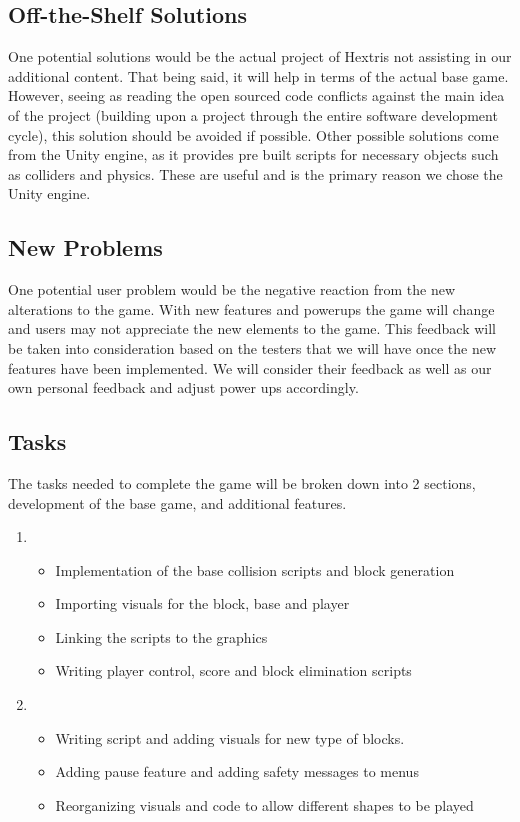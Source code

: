 \documentclass[12pt, titlepage]{article}
\begin{document}
\subsection{Off-the-Shelf Solutions}
One potential solutions would be the actual project of Hextris not assisting in our additional content. That being said, it will help in terms of the actual base game. However, seeing as reading the open sourced code conflicts against the main idea of the project (building upon a project through the entire software development cycle), this solution should be avoided if possible. Other possible solutions come from the Unity engine, as it provides pre built scripts for necessary objects such as colliders and physics. These are useful and is the primary reason we chose the Unity engine.

\subsection{New Problems}
One potential user problem would be the negative reaction from the new alterations to the game. With new features and powerups the game will change and users may not appreciate the new elements to the game. This feedback will be taken into consideration based on the testers that we will have once the new features have been implemented. We will consider their feedback as well as our own personal feedback and adjust power ups accordingly. 
\newpage 
\subsection{Tasks}
The tasks needed to complete the game will be broken down into 2 sections, development of the base game, and additional features. 

\begin{enumerate}
\item 
\begin{itemize}
\item Implementation of the base collision scripts and block generation
\item Importing visuals for the block, base and player
\item Linking the scripts to the graphics
\item Writing player control, score and block elimination scripts
\end{itemize}

\item
\begin{itemize}
\item Writing script and adding visuals for new type of blocks.
\item Adding pause feature and adding safety messages to menus
\item Reorganizing visuals and code to allow different shapes to be played
\end{itemize}
\end{enumerate}
\end{document}
